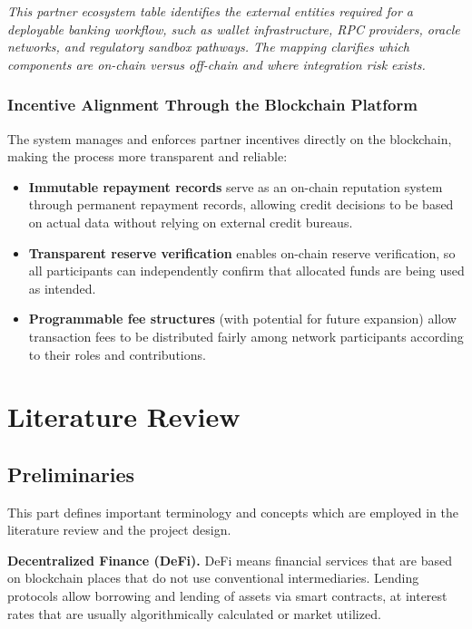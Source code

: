 \documentclass[12pt,a4paper]{report}
\begin{document}
\vspace{2pt}
\noindent\textit{\small This partner ecosystem table identifies the external entities required for a deployable banking workflow, such as wallet infrastructure, RPC providers, oracle networks, and regulatory sandbox pathways. The mapping clarifies which components are on-chain versus off-chain and where integration risk exists.}

\subsection{Incentive Alignment Through the Blockchain Platform}

The system manages and enforces partner incentives directly on the blockchain, making the process more transparent and reliable:

\begin{itemize}[noitemsep]
\item \textbf{Immutable repayment records} serve as an on-chain reputation system through permanent repayment records, allowing credit decisions to be based on actual data without relying on external credit bureaus.
\item \textbf{Transparent reserve verification} enables on-chain reserve verification, so all participants can independently confirm that allocated funds are being used as intended.
\item \textbf{Programmable fee structures} (with potential for future expansion) allow transaction fees to be distributed fairly among network participants according to their roles and contributions.
\end{itemize}


\chapter{Literature Review}

\section{Preliminaries}

This part defines important terminology and concepts which are employed in the literature review and the project design.

\hangindent=0.5in \textbf{Decentralized Finance (DeFi).} DeFi means financial services that are based on blockchain places that do not use conventional intermediaries. Lending protocols allow borrowing and lending of assets via smart contracts, at interest rates that are usually algorithmically calculated or market utilized.
\end{document}
